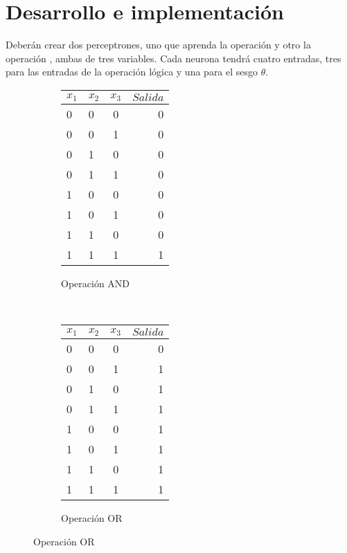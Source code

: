 \section{Desarrollo e implementaci\'on}

\noindent Deberán crear dos perceptrones, uno que aprenda la operación  y otro la operación , ambas de tres variables. Cada neurona tendrá cuatro entradas, tres para las entradas de la operación lógica y una para el sesgo $\theta$.\par

\begin{figure}[H]
    \centering
    \begin{subfigure}[b]{0.4\textwidth}
        \centering
        \begin{tabular}{ l l c | r }
          $x_1$ & $x_2$ & $x_3$ & $Salida$\\ \hline
          0 & 0 & 0 & 0  \\ \hline
          0 & 0 & 1 & 0  \\ \hline
          0 & 1 & 0 & 0  \\ \hline
          0 & 1 & 1 & 0  \\ \hline
          1 & 0 & 0 & 0  \\ \hline
          1 & 0 & 1 & 0  \\ \hline
          1 & 1 & 0 & 0  \\ \hline
          1 & 1 & 1 & 1  \\
        \end{tabular}
        \caption{Operación AND}
    \end{subfigure}
    ~ 
    \begin{subfigure}[b]{0.4\textwidth}
        \centering
        \begin{tabular}{ l l c | r }
          $x_1$ & $x_2$ & $x_3$ & $Salida$\\ \hline
          0 & 0 & 0 & 0  \\ \hline
          0 & 0 & 1 & 1  \\ \hline
          0 & 1 & 0 & 1  \\ \hline
          0 & 1 & 1 & 1  \\ \hline
          1 & 0 & 0 & 1  \\ \hline
          1 & 0 & 1 & 1  \\ \hline
          1 & 1 & 0 & 1  \\ \hline
          1 & 1 & 1 & 1  \\
        \end{tabular}
        \caption{Operación OR}
    \end{subfigure}
\end{figure}

